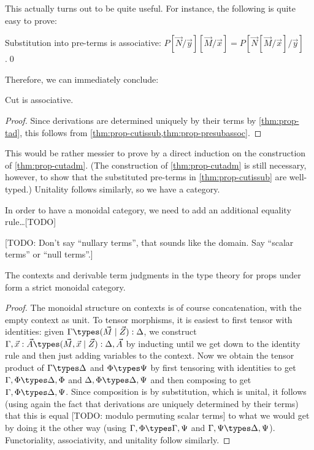 This actually turns out to be quite useful.
For instance, the following is quite easy to prove:

\begin{lem}\label{thm:prop-presubassoc}
  Substitution into pre-terms is associative: $P[\vec N/\vec y][\vec M/\vec x] = P[\vec N[\vec M/\vec x]/\vec y]$.\qed
\end{lem}

Therefore, we can immediately conclude:

\begin{thm}\label{thm:prop-cutassoc}
  Cut is associative.
\end{thm}
\begin{proof}
  Since derivations are determined uniquely by their terms by \cref{thm:prop-tad}, this follows from \cref{thm:prop-cutissub,thm:prop-presubassoc}.
\end{proof}

This would be rather messier to prove by a direct induction on the construction of \cref{thm:prop-cutadm}.
(The construction of \cref{thm:prop-cutadm} is still necessary, however, to show that the substituted pre-terms in \cref{thm:prop-cutissub} are well-typed.)
Unitality follows similarly, so we have a category.

In order to have a monoidal category, we need to add an additional equality rule\dots [TODO]

[TODO: Don't say ``nullary terms'', that sounds like the domain.  Say ``scalar terms'' or ``null terms''.]

\begin{thm}\label{thm:prop-moncat}
  The contexts and derivable term judgments in the type theory for props under \cG form a strict monoidal category.
\end{thm}
\begin{proof}
  The monoidal structure on contexts is of course concatenation, with the empty context as unit.
  To tensor morphisms, it is easiest to first tensor with identities: given $\Gamma\types (\vec M\mid \vec Z):\Delta$, we construct $\Gamma,\vec x:\vec A\types (\vec M,\vec x\mid \vec Z):\Delta,\vec A$ by inducting until we get down to the identity rule and then just adding variables to the context.
  Now we obtain the tensor product of $\Gamma\types \Delta$ and $\Phi\types \Psi$ by first tensoring with identities to get $\Gamma,\Phi \types \Delta,\Phi$ and $\Delta,\Phi\types \Delta,\Psi$ and then composing to get $\Gamma,\Phi\types \Delta,\Psi$.
  Since composition is by substitution, which is unital, it follows (using again the fact that derivations are uniquely determined by their terms) that this is equal [TODO: modulo permuting scalar terms] to what we would get by doing it the other way (using $\Gamma,\Phi\types \Gamma,\Psi$ and $\Gamma,\Psi\types \Delta,\Psi$).
  Functoriality, associativity, and unitality follow similarly.
\end{proof}


